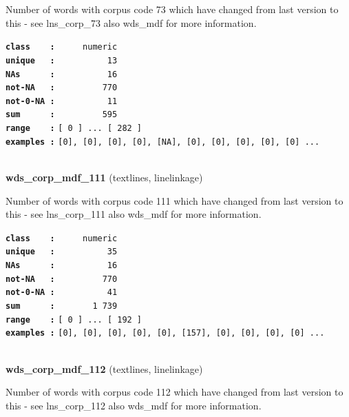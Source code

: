 \documentclass[]{article}
\begin{document}
Number of words with corpus code 73 which have changed from last version
to this - see lns\_corp\_73 also wds\_mdf for more information.

\textbf{\texttt{class\ \ \ \ :}} \texttt{~~~~~numeric}\\
\textbf{\texttt{unique\ \ \ :}} \texttt{~~~~~~~~~~13}\\
\textbf{\texttt{NAs\ \ \ \ \ \ :}} \texttt{~~~~~~~~~~16}\\
\textbf{\texttt{not-NA\ \ \ :}} \texttt{~~~~~~~~~770}\\
\textbf{\texttt{not-0-NA\ :}} \texttt{~~~~~~~~~~11}\\
\textbf{\texttt{sum\ \ \ \ \ \ :}} \texttt{~~~~~~~~~595}\\
\textbf{\texttt{range\ \ \ \ :}}
\texttt{{[}\ 0\ {]}\ ...\ {[}\ 282\ {]}}\\
\textbf{\texttt{examples\ :}}
\texttt{{[}0{]},\ {[}0{]},\ {[}0{]},\ {[}0{]},\ {[}NA{]},\ {[}0{]},\ {[}0{]},\ {[}0{]},\ {[}0{]},\ {[}0{]}\ ...}\\

~

\textbf{wds\_corp\_mdf\_111} (textlines, linelinkage)

Number of words with corpus code 111 which have changed from last
version to this - see lns\_corp\_111 also wds\_mdf for more information.

\textbf{\texttt{class\ \ \ \ :}} \texttt{~~~~~numeric}\\
\textbf{\texttt{unique\ \ \ :}} \texttt{~~~~~~~~~~35}\\
\textbf{\texttt{NAs\ \ \ \ \ \ :}} \texttt{~~~~~~~~~~16}\\
\textbf{\texttt{not-NA\ \ \ :}} \texttt{~~~~~~~~~770}\\
\textbf{\texttt{not-0-NA\ :}} \texttt{~~~~~~~~~~41}\\
\textbf{\texttt{sum\ \ \ \ \ \ :}} \texttt{~~~~~~~1~739}\\
\textbf{\texttt{range\ \ \ \ :}}
\texttt{{[}\ 0\ {]}\ ...\ {[}\ 192\ {]}}\\
\textbf{\texttt{examples\ :}}
\texttt{{[}0{]},\ {[}0{]},\ {[}0{]},\ {[}0{]},\ {[}0{]},\ {[}157{]},\ {[}0{]},\ {[}0{]},\ {[}0{]},\ {[}0{]}\ ...}\\

~

\textbf{wds\_corp\_mdf\_112} (textlines, linelinkage)

Number of words with corpus code 112 which have changed from last
version to this - see lns\_corp\_112 also wds\_mdf for more information.
\end{document}
